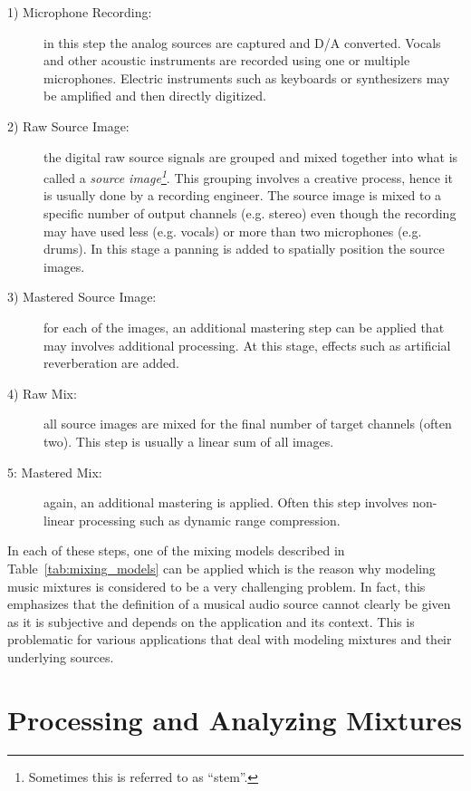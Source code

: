 \begin{description}
  \item[1) Microphone Recording:] in this step the analog sources are captured and D/A converted. 
  Vocals and other acoustic instruments are recorded using one or multiple microphones.
  Electric instruments such as keyboards or synthesizers may be amplified and then directly digitized.
  \item[2) Raw Source Image:] the digital raw source signals are grouped and mixed together into what is called a \emph{source image\footnote{Sometimes this is referred to as ``stem''.}}.
  This grouping involves a creative process, hence it is usually done by a recording engineer.
  The source image is mixed to a specific number of output channels (e.g. stereo) even though the recording may have used less (e.g. vocals) or more than two microphones (e.g. drums).
  In this stage a panning is added to spatially position the source images.
  \item[3) Mastered Source Image:] for each of the images, an additional mastering step can be applied that may involves additional processing.
  At this stage, effects such as artificial reverberation are added.
  \item[4) Raw Mix:] all source images are mixed for the final number of target channels (often two).
  This step is usually a linear sum of all images.
  \item[5: Mastered Mix:] again, an additional mastering is applied.
  Often this step involves non-linear processing such as dynamic range compression.
\end{description}

In each of these steps, one of the mixing models described in Table~\ref{tab:mixing_models} can be applied which is the reason why modeling music mixtures is considered to be a very challenging problem.
In fact, this emphasizes that the definition of a musical audio source cannot clearly be given as it is subjective and depends on the application and its context.
This is problematic for various applications that deal with modeling mixtures and their underlying sources.

\hypertarget{processing-and-analysis-of-mixtures}{%
\section{Processing and Analyzing Mixtures}\label{sec:processing-and-analzing-of-mixtures}}


